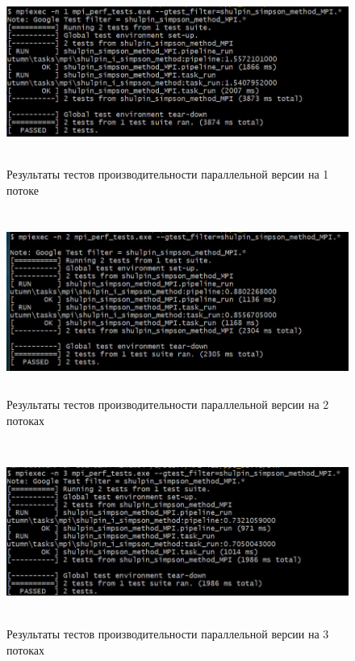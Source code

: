 \documentclass[12pt,a4paper]{article}
\begin{document}
\begin{figure}[H]
\centering
\includegraphics[height=6cm]{img/1nmpiperftest.jpg}
\caption{\label{fig:visualClass} Результаты тестов производительности параллельной версии на 1 потоке}
\end{figure}

\begin{figure}[H]
\centering
\includegraphics[height=6cm]{img/2nmpiperftest.jpg}
\caption{\label{fig:visualClass} Результаты тестов производительности параллельной версии на 2 потоках}
\end{figure}

\begin{figure}[H]
\centering
\includegraphics[height=6cm]{img/3nmpiperftest.jpg}
\caption{\label{fig:visualClass} Результаты тестов производительности параллельной версии на 3 потоках}
\end{figure}
\end{document}
